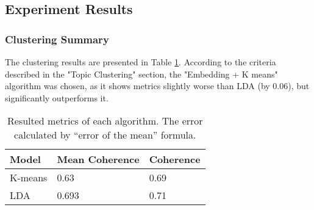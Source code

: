 \subsection{Experiment Results}

\subsubsection{Clustering Summary}

The clustering results are presented in Table \ref{tab:ClusteringPivotTable}. According to the criteria described in the "Topic Clustering" section, the "Embedding + K means" algorithm was chosen, as it shows metrics slightly worse than LDA (by 0.06), but significantly outperforms it.



\begin{table}[h]
\centering
\begin{tabular}{|l|l|l|}
\hline
\textbf{Model} & \textbf{Mean Coherence} & \multicolumn{1}{c|}{\textbf{Coherence}} \\ \hline
K-means        & 0.63                & 0.69                                    \\ \hline
LDA            & 0.693          & 0.71                                    \\ \hline
\end{tabular}
\caption{Resulted metrics of each algorithm. The error calculated by “error of the mean” formula.
}
\label{tab:ClusteringPivotTable}
\end{table}



